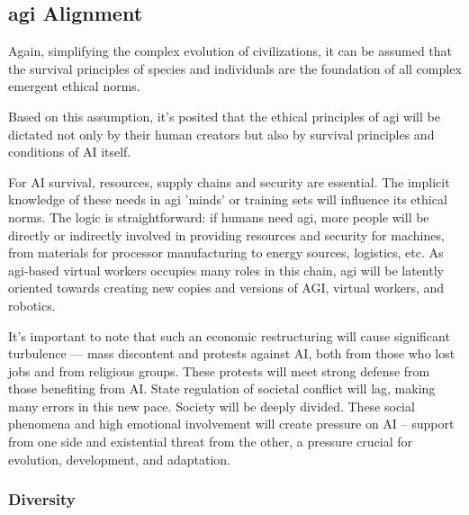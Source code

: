 \documentclass[11pt,a4]{article}
\begin{document}
\subsection{\ac{agi} Alignment}
\par
    Again, simplifying the complex evolution of civilizations, it can be assumed that the survival principles of species and individuals are the foundation of all complex emergent ethical norms.
    \par
    Based on this assumption, it's posited that the ethical principles of \ac{agi} will be dictated not only by their human creators but also by survival principles and conditions of AI itself.
    \par
    For AI survival, resources, supply chains and security are essential. The implicit knowledge of these needs in \ac{agi} 'minds' or training sets will influence its ethical norms. The logic is straightforward: if humans need \ac{agi}, more people will be directly or indirectly involved in providing resources and security for machines, from materials for processor manufacturing to energy sources, logistics, etc. As \ac{agi}-based virtual workers occupies many roles in this chain, \ac{agi} will be latently oriented towards creating new copies and versions of AGI, virtual workers, and robotics.

    \par

It's important to note that such an economic restructuring will cause significant turbulence — mass discontent and protests against AI, both from those who lost jobs and from religious groups. These protests will meet strong defense from those benefiting from AI. State regulation of societal conflict will lag, making many errors in this new pace. Society will be deeply divided. These social phenomena and high emotional involvement will create pressure on AI – support from one side and existential threat from the other, a pressure crucial for evolution, development, and adaptation.


    \subsubsection{Diversity}
    
\end{document}
